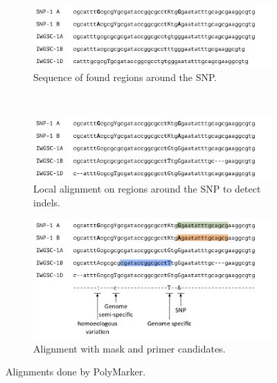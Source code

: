\begin{figure}
    \begin{subfigure}[b]{0.4\textwidth}
        \includegraphics[width=1\textwidth]{PolyMarker/Figures/alignment/scaffoldsFound.pdf}
        \caption{Sequence of found regions around the SNP.}
        \label{fig:poly:globalSequence}
    \end{subfigure}
    ~ %
    \begin{subfigure}[b]{0.4\textwidth}
        \includegraphics[width=1\textwidth]{PolyMarker/Figures/alignment/localAlignment.pdf} 
        \caption{Local alignment on regions around the SNP to detect indels.}
        \label{fig:poly:localSequence}
    \end{subfigure}

    \begin{subfigure}[b]{0.8\textwidth}
        \includegraphics[width=1\textwidth]{PolyMarker/Figures/alignment/mask.pdf} 
        \caption{Alignment with mask and primer candidates.}
        \label{fig:poly:mask}

    \end{subfigure}
    \caption{Alignments done by PolyMarker.}\label{fig:global}
\end{figure}

